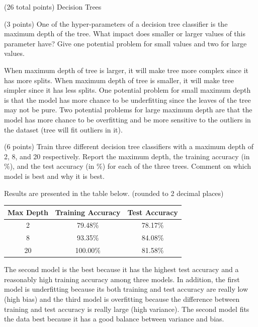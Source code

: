 \documentclass[12pt]{article}
\begin{document}
\begin{question}{(26 total points) Decision Trees}
%
%
\begin{subquestion}{(3 points) 
One of the hyper-parameters of a decision tree classifier is the maximum depth of the tree. 
What impact does smaller or larger values of this parameter have? Give one potential problem for small values and two for large values. 
}


\begin{answerbox}{10em}
When maximum depth of tree is larger, it will make tree more complex since it has more splits. When maximum depth of tree is smaller, it will make tree simpler since it has less splits. One potential problem for small maximum depth is that the model has more chance to be underfitting since the leaves of the tree may not be pure. Two potential problems for large maximum depth are that the model has more chance to be overfitting and be more sensitive to the outliers in the dataset (tree will fit outliers in it).
\end{answerbox}



\end{subquestion}


%
%
\begin{subquestion}{(6 points) 
Train three different decision tree classifiers with a maximum depth of 2, 8, and 20 respectively.
Report the maximum depth, the training accuracy (in \%), and the test accuracy (in \%) for each of the three trees.
Comment on which model is best and why it is best. \\
}


\begin{answerbox}{20em}
Results are presented in the table below. (rounded to 2 decimal places)
\begin{center}
\begin{tabular}{|c|c|c|}
\hline
Max Depth & Training Accuracy & Test Accuracy \\
\hline
2 & 79.48\% & 78.17\% \\
8 & 93.35\% & 84.08\% \\
20 & 100.00\% & 81.58\% \\
\hline
\end{tabular}
\end{center}
The second model is the best because it has the highest test accuracy and a reasonably high training accuracy among three models. In addition, the first model is underfitting because its both training and test accuracy are really low (high bias) and the third model is overfitting because the difference between training and test accuracy is really large (high variance). The second model fits the data best because it has a good balance between variance and bias.
\end{answerbox}




\end{subquestion}
\end{question}
\end{document}
